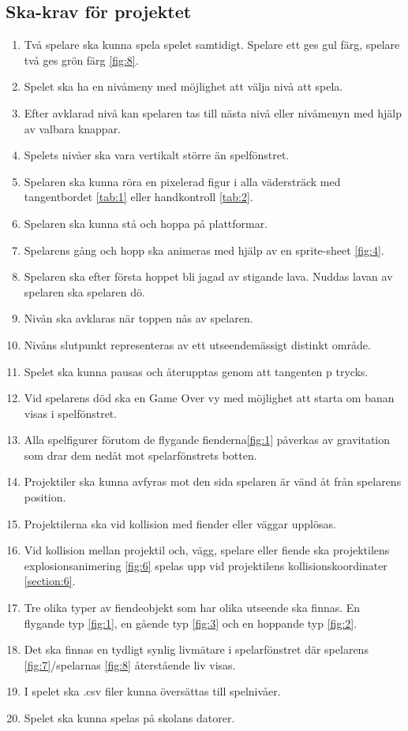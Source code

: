 \documentclass{TDP005mall}
\begin{document}
\subsection{Ska-krav för projektet} %
\begin{enumerate}
\item Två spelare ska kunna spela spelet samtidigt. Spelare ett ges gul färg, spelare två ges grön färg \ref{fig:8}.
\item Spelet ska ha en nivåmeny med möjlighet att välja nivå att spela.
\item Efter avklarad nivå kan spelaren tas till nästa nivå eller nivåmenyn med hjälp av valbara knappar. 
\item Spelets nivåer ska vara vertikalt större än spelfönstret.
\item Spelaren ska kunna röra en pixelerad figur i alla vädersträck med tangentbordet \ref{tab:1} eller handkontroll \ref{tab:2}.
\item Spelaren ska kunna stå och hoppa på plattformar.
\item Spelarens gång och hopp ska animeras med hjälp av en sprite-sheet \ref{fig:4}.
\item Spelaren ska efter första hoppet bli jagad av stigande lava. Nuddas lavan av spelaren ska spelaren dö.
\item Nivån ska avklaras när toppen nås av spelaren.
\item Nivåns slutpunkt representeras av ett utseendemässigt distinkt område.
\item Spelet ska kunna pausas och återupptas genom att tangenten p trycks.
\item Vid spelarens död ska en Game Over vy med möjlighet att starta om banan visas i spelfönstret.
\item Alla spelfigurer förutom de flygande fienderna\ref{fig:1} påverkas av gravitation som drar dem nedåt mot spelarfönstrets botten.
\item Projektiler ska kunna avfyras mot den sida spelaren är vänd åt från spelarens position.
\item Projektilerna ska vid kollision med fiender eller väggar upplösas.
\item Vid kollision mellan projektil och, vägg, spelare eller fiende ska projektilens explosionsanimering \ref{fig:6} spelas upp vid projektilens kollisionskoordinater \ref{section:6}.
\item Tre olika typer av fiendeobjekt som har olika utseende ska finnas. En flygande typ \ref{fig:1}, en gående typ \ref{fig:3} och en hoppande typ \ref{fig:2}.
\item Det ska finnas en tydligt synlig livmätare i spelarfönstret där spelarens \ref{fig:7}/spelarnas \ref{fig:8} återstående liv visas.
\item I spelet ska .csv filer kunna översättas till spelnivåer.
\item Spelet ska kunna spelas på skolans datorer.
\end{enumerate}
\end{document}
